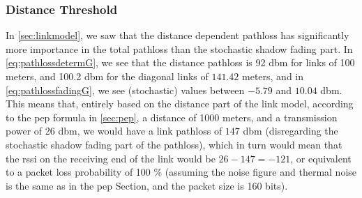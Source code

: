 \subsubsection{Distance Threshold}\label{sec:distancethreshold}
In \autoref{sec:linkmodel}, we saw that the distance dependent \gls{pathloss} has significantly more importance in the total \gls{pathloss} than the stochastic shadow fading part. In \autoref{eq:pathlossdetermG}, we see that the distance \gls{pathloss} is 92 \acrshort{dbm} for links of 100 meters, and 100.2 \acrshort{dbm} for the diagonal links of $141.42$ meters, and in \autoref{eq:pathlossfadingG}, we see (stochastic) values between $-5.79$ and $10.04$ \acrshort{dbm}. This means that, entirely based on the distance part of the link model, according to the \gls{pep} formula in \autoref{sec:pep}, a distance of 1000 meters, and a transmission power of 26 \acrshort{dbm}, we would have a link \gls{pathloss} of $147$ \acrshort{dbm} (disregarding the stochastic shadow fading part of the \gls{pathloss}), which in turn would mean that the \gls{rssi} on the receiving end of the link would be $26 - 147 = -121$, or equivalent to a packet loss probability of 100 \% (assuming the noise figure and thermal noise is the same as in the \gls{pep} Section, and the packet size is 160 bits).





